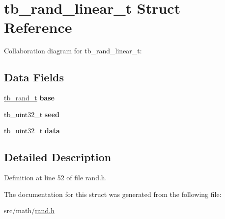 \hypertarget{structtb__rand__linear__t}{\section{tb\-\_\-rand\-\_\-linear\-\_\-t Struct Reference}
\label{structtb__rand__linear__t}
}


Collaboration diagram for tb\-\_\-rand\-\_\-linear\-\_\-t\-:
\subsection*{Data Fields}
\begin{DoxyCompactItemize}
\item 
\hypertarget{structtb__rand__linear__t_a9091a73b6ee9d1d7a496a17513c89611}{\hyperlink{structtb__rand__t}{tb\-\_\-rand\-\_\-t} {\bfseries base}}\label{structtb__rand__linear__t_a9091a73b6ee9d1d7a496a17513c89611}

\item 
\hypertarget{structtb__rand__linear__t_a76d9ce08da4a70b9a2081c30d339b4fa}{tb\-\_\-uint32\-\_\-t {\bfseries seed}}\label{structtb__rand__linear__t_a76d9ce08da4a70b9a2081c30d339b4fa}

\item 
\hypertarget{structtb__rand__linear__t_ae16312193fe3edfd657d8dbf21c78bcc}{tb\-\_\-uint32\-\_\-t {\bfseries data}}\label{structtb__rand__linear__t_ae16312193fe3edfd657d8dbf21c78bcc}

\end{DoxyCompactItemize}


\subsection{Detailed Description}


Definition at line 52 of file rand.\-h.



The documentation for this struct was generated from the following file\-:\begin{DoxyCompactItemize}
\item 
src/math/\hyperlink{rand_8h}{rand.\-h}\end{DoxyCompactItemize}
